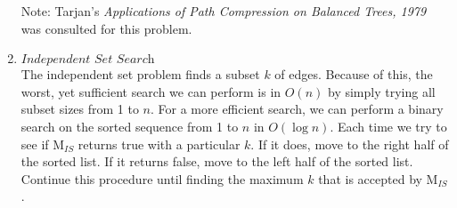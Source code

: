 \documentclass[]{report}
\begin{document}
\begin{enumerate}
	 Note: Tarjan's \textit{Applications of Path Compression on Balanced Trees, 1979} was consulted for this problem.\\
	 
	 \item $\textit{Independent Set Search}$ \\
	 
	 The independent set problem finds a subset $ k $ of edges. Because of this, the worst, yet sufficient search we can perform is in $ O(n) $ by simply trying all subset sizes from 1 to $ n $. For a more efficient search, we can perform a binary search on the sorted sequence from 1 to $ n $  in $ O( \log n) $.  Each time we try to see if M$_{IS}$ returns true with a particular $ k $. If it does, move to the right half of the sorted list. If it returns false, move to the left half of the sorted list. Continue this procedure until finding the maximum $ k $ that is accepted by M$_{IS}$.
	 
	 
	 
\end{enumerate}
\end{document}

